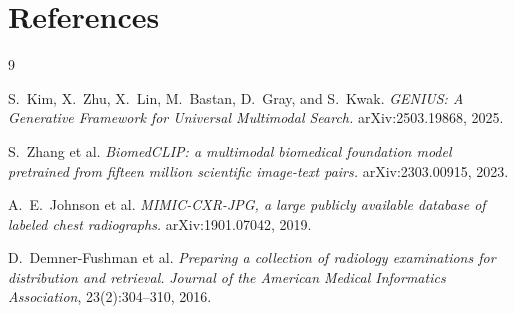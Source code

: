 \documentclass[11pt,a4paper]{article}
\begin{document}
\section*{References}
\begin{thebibliography}{9}

S.\ Kim, X.\ Zhu, X.\ Lin, M.\ Bastan, D.\ Gray, and S.\ Kwak.
\textit{GENIUS: A Generative Framework for Universal Multimodal Search.}
arXiv:2503.19868, 2025.

S.\ Zhang et al.
\textit{BiomedCLIP: a multimodal biomedical foundation model pretrained from
fifteen million scientific image-text pairs.}
arXiv:2303.00915, 2023.

A.\ E.\ Johnson et al.
\textit{MIMIC-CXR-JPG, a large publicly available database of labeled
chest radiographs.}
arXiv:1901.07042, 2019.

D.\ Demner-Fushman et al.
\textit{Preparing a collection of radiology examinations for distribution
and retrieval.}
\textit{Journal of the American Medical Informatics Association},
23(2):304--310, 2016.

\end{thebibliography}
\end{document}
